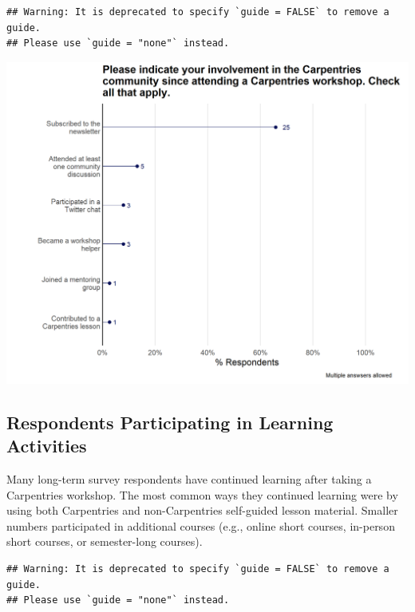 \documentclass[
]{article}
\makeatletter
\def\maxwidth{\ifdim\Gin@nat@width>\linewidth\linewidth\else\Gin@nat@width\fi}
\makeatother
\begin{document}
\begin{verbatim}
## Warning: It is deprecated to specify `guide = FALSE` to remove a guide.
## Please use `guide = "none"` instead.
\end{verbatim}

\includegraphics[width=\maxwidth]{../figures/2020-12-longterm-community_involvement-1}

\hypertarget{respondents-participating-in-learning-activities}{%
\subsection{Respondents Participating in Learning
Activities}\label{respondents-participating-in-learning-activities}}

Many long-term survey respondents have continued learning after taking a
Carpentries workshop. The most common ways they continued learning were
by using both Carpentries and non-Carpentries self-guided lesson
material. Smaller numbers participated in additional courses (e.g.,
online short courses, in-person short courses, or semester-long
courses).

\begin{verbatim}
## Warning: It is deprecated to specify `guide = FALSE` to remove a guide.
## Please use `guide = "none"` instead.
\end{verbatim}
\end{document}
